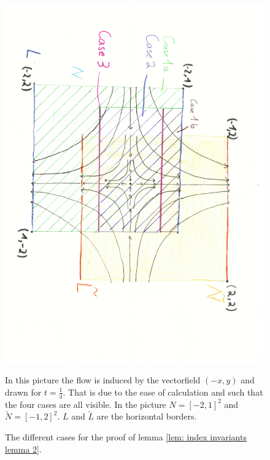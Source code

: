 \begin{figure}[p!]
    \centering
    \includegraphics[angle=90,width=1\textwidth]{Text/Pictures/Index Pairs prove.pdf}
    \caption{The different cases for the proof of lemma \ref{lem: index invariants lemma 2}.}
    \label{fig: The different cases for the proof of lemma}
    In this picture the flow is induced by the vectorfield $(-x,y)$ and drawn for $t=\frac{1}{3}$. That is due to the ease of calculation and such that the four cases are all visible. In the picture $N=[-2,1]^2$ and $\tilde{N}=[-1,2]^2$. $L$ and $\tilde{L}$ are the horizontal borders. 
    \end{figure}\clearpage
    
